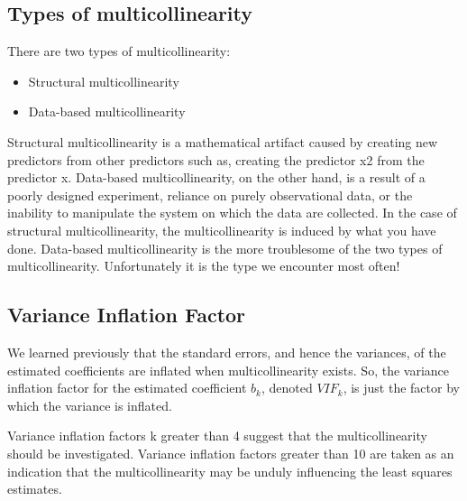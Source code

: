 \documentclass[]{report}
\begin{document}
\subsection{Types of multicollinearity}


There are two types of multicollinearity: 
\begin{itemize}
\item Structural multicollinearity
\item Data-based multicollinearity
\end{itemize}
Structural multicollinearity is a mathematical artifact caused by creating new predictors from other predictors  such as, creating the predictor x2 from the predictor x. 
Data-based multicollinearity, on the other hand, is a result of a poorly designed experiment, reliance on purely observational data, or the inability to manipulate the system on which the data are collected. 
In the case of structural multicollinearity, the multicollinearity is induced by what you have done. Data-based multicollinearity is the more troublesome of the two types of multicollinearity. Unfortunately it is the type we encounter most often!



\subsection{Variance Inflation Factor}



We learned previously that the standard errors, and hence the variances, of 
the estimated coefficients are inflated when multicollinearity exists. 
So, the variance inflation factor for the estimated coefficient $b_k$, denoted $VIF_k$, 
is just the factor by which the variance is inflated. 

Variance inflation factors k greater than 4 suggest that the multicollinearity should be investigated. 
Variance inflation factors greater than 10 are taken as an indication that the multicollinearity may be unduly influencing the least squares estimates. 
\end{document}
